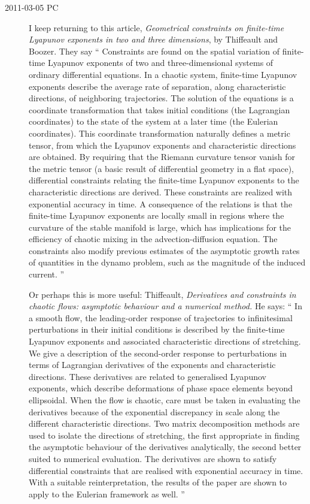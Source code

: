 \begin{description}
\item[2011-03-05 PC] I keep returning to this article,
\emph{Geometrical constraints on finite-time
    		{Lyapunov} exponents in two and three dimensions},  by
Thiffeault and Boozer. They say ``
Constraints are found on the spatial variation of finite-time Lyapunov
exponents of two and three-dimensional systems of ordinary differential
equations. In a chaotic system, finite-time Lyapunov exponents describe
the average rate of separation, along characteristic directions, of
neighboring trajectories. The solution of the equations is a coordinate
transformation that takes initial conditions (the Lagrangian coordinates)
to the state of the system at a later time (the Eulerian coordinates).
This coordinate transformation naturally defines a metric tensor, from
which the Lyapunov exponents and characteristic directions are obtained.
By requiring that the Riemann curvature tensor vanish for the metric
tensor (a basic result of differential geometry in a flat space),
differential constraints relating the finite-time Lyapunov exponents to
the characteristic directions are derived. These constraints are realized
with exponential accuracy in time. A consequence of the relations is that
the finite-time Lyapunov exponents are locally small in regions where the
curvature of the stable manifold is large, which has implications for the
efficiency of chaotic mixing in the advection-diffusion equation. The
constraints also modify previous estimates of the asymptotic growth rates
of quantities in the dynamo problem, such as the magnitude of the induced
current.
''

Or perhaps this is more useful:
Thiffeault,
\emph{Derivatives and constraints in chaotic flows:
asymptotic behaviour and a numerical method.}
He says: ``
In a smooth flow, the leading-order response of trajectories to
infinitesimal perturbations in their initial conditions is described by
the finite-time Lyapunov exponents and associated characteristic
directions of stretching. We give a description of the second-order
response to perturbations in terms of Lagrangian derivatives of the
exponents and characteristic directions. These derivatives are related to
generalised Lyapunov exponents, which describe deformations of phase
space elements beyond ellipsoidal. When the flow is chaotic, care must be
taken in evaluating the derivatives because of the exponential
discrepancy in scale along the different characteristic directions. Two
matrix decomposition methods are used to isolate the directions of
stretching, the first appropriate in finding the asymptotic behaviour of
the derivatives analytically, the second better suited to numerical
evaluation. The derivatives are shown to satisfy differential constraints
that are realised with exponential accuracy in time. With a suitable
reinterpretation, the results of the paper are shown to apply to the
Eulerian framework as well.
''


\end{description}
